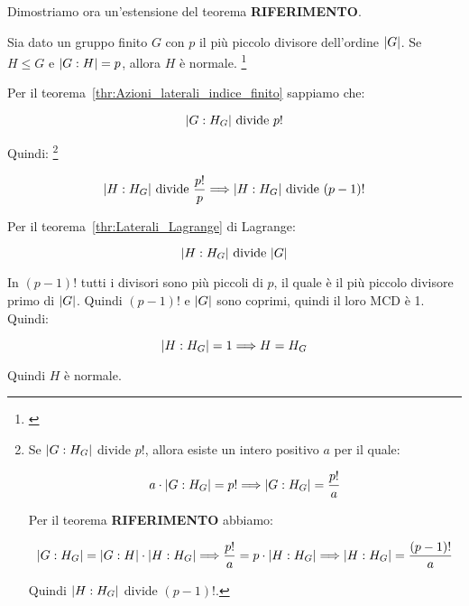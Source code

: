 Dimostriamo ora un'estensione del teorema \textbf{RIFERIMENTO}.

\begin{esercizio}
	Sia dato un gruppo finito $G$ con $p$ il più piccolo divisore dell'ordine $\lvert G \rvert$. Se $H \le G$ e $\lvert G:H \rvert = p$, allora $H$ è normale.
	\footnote{\cite[Week 2, Exercise 8]{lucchini_week}}
\end{esercizio}
\begin{soluzione}
	Per il teorema~\ref{thr:Azioni_laterali_indice_finito} sappiamo che:
	
	\begin{equation}
		\lvert G:H_G \rvert \text{ divide } p!
	\end{equation}

	Quindi:
	\footnote{
		Se $\lvert G:H_G \rvert$ divide $p!$, allora esiste un intero positivo $a$ per il quale:
		
		\begin{equation}
			a \cdot \lvert G:H_G \rvert = p! \Longrightarrow \lvert G:H_G \rvert = \dfrac{p!}{a}
		\end{equation} 
	
		Per il teorema \textbf{RIFERIMENTO} abbiamo:
		
		\begin{equation}
			\lvert G:H_G \rvert = \lvert G:H \rvert \cdot \lvert H:H_G \rvert \Longrightarrow
			\dfrac{p!}{a} = p \cdot \lvert H:H_G \rvert \Longrightarrow
			\lvert H:H_G \rvert = \dfrac{(p-1)!}{a}
		\end{equation}
	
		Quindi $\lvert H:H_G \rvert$ divide $(p-1)!$.
	}
	
	\begin{equation}
		\lvert H:H_G \rvert \text{ divide } \dfrac{p!}{p} \Longrightarrow \lvert H:H_G \rvert \text{ divide } (p-1)!
	\end{equation}

	Per il teorema~\ref{thr:Laterali_Lagrange} di Lagrange:
	
	\begin{equation}
		\lvert H:H_G \rvert \text{ divide } \lvert G \rvert
	\end{equation}

	In $(p-1)!$ tutti i divisori sono più piccoli di $p$, il quale è il più piccolo divisore primo di $\lvert G \rvert$. Quindi $(p-1)!$ e $\lvert G \rvert$ sono coprimi, quindi il loro MCD è 1. Quindi:
	
	\begin{equation}
		\lvert H:H_G \rvert = 1 \Longrightarrow H = H_G
	\end{equation} 

	Quindi $H$ è normale.

\end{soluzione}

